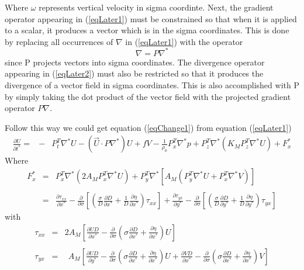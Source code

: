 \documentclass[oribibl]{llncs}
\begin{document}
Where $\omega$ represents vertical velocity in sigma coordinte. 
Next, the gradient operator appearing in (\ref{eqLater1}) must be constrained so that when it is applied to a scalar, it produces a vector which is in the sigma coordinates. This is done by replacing all occurrences of $\nabla$ in (\ref{eqLater1}) with the operator
\begin{equation}
 \nabla=P\nabla^* \nonumber
\end{equation}
since P projects vectors into sigma coordinates. The divergence operator appearing in (\ref{eqLater2}) must also be restricted so that it produces the divergence of a vector field in sigma coordinates. This is also accomplished with P by simply taking the dot product of the vector field with the projected gradient operator $P\nabla$.

Follow this way we could get equation (\ref{eqChange1}) from equation (\ref{eqLater1})
\begin{eqnarray}
\frac{\partial U}{\partial t^*} = &-&P^T_t\nabla^* U -(\vec{U} \cdot P \nabla^*)U+fV - \frac{1}{\rho_0} P^T_x\nabla^*p + P^T_z\nabla^*\left ( K_M P^T_z\nabla^*U\right) + F^*_x   \label{eqChange1} 
\end{eqnarray}
Where 
\begin{eqnarray}
F^*_x&=&P^T_x \nabla^* \left(2A_M P^T_x \nabla^* {U} \right) + P^T_y \nabla^* \left[A_M \left(P^T_y \nabla^* {U} + P^T_x \nabla^* {V}\right) \right]  \\ \nonumber \\
     &=& \frac{\partial \tau_{xx}}{\partial x^*} -\frac{\partial}{\partial \sigma} \left[ \left(  \frac{\sigma}{D} \frac{\partial D}{\partial x^*} + \frac{1}{D} \frac{\partial \eta}{\partial x^*} \right) \tau_{xx}  \right] +  \frac{\partial \tau_{yx}}{\partial y^*} -\frac{\partial}{\partial \sigma} \left[ \left(  \frac{\sigma}{D} \frac{\partial D}{\partial y^*} + \frac{1}{D} \frac{\partial \eta}{\partial y^*} \right) \tau_{yx}  \right]   \nonumber 
\end{eqnarray}
with
\begin{eqnarray}
\tau_{xx} &=& 2 A_M \left[ \frac{\partial UD}{\partial x^*} -\frac{\partial}{\partial \sigma} \left( \sigma \frac{\partial D}{\partial x^*} + \frac{\partial \eta}{\partial x^*} \right)U \right] \\
\nonumber \\
\tau_{yx} &=& \ \ A_M  \left[ \frac{\partial UD}{\partial y^*} -\frac{\partial}{\partial \sigma} \left( \sigma \frac{\partial D}{\partial x^*} + \frac{\partial \eta}{\partial x^*} \right)U +  \frac{\partial VD}{\partial x^*} -\frac{\partial}{\partial \sigma} \left( \sigma \frac{\partial D}{\partial x^*} + \frac{\partial \eta}{\partial x^*} \right)V \right]
\end{eqnarray}
\end{document}
